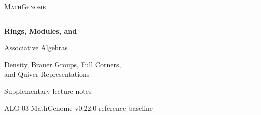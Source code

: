 \documentclass[11pt,oneside,openany]{book}
\theoremstyle{definition}
\theoremstyle{remark}
\begin{document}
\frontmatter
\hypersetup{pageanchor=false}
\begin{titlepage}
  \thispagestyle{empty}
  \begin{flushleft}
    \vspace*{0.65in}
    {\large\scshape\color{deepgreen}MathGenome\par}
    \vspace{0.32in}
    {\color{rulegreen}\rule{0.94\textwidth}{0.65pt}\par}
    \vspace{0.45in}
    {\color{ink}\fontsize{34}{39}\selectfont\bfseries
       Rings, Modules, and\par Associative Algebras\par}
    \vspace{0.30in}
    {\color{deepgreen}\Large
       Density, Brauer Groups, Full Corners,\\[3pt]
       and Quiver Representations\par}
    \vfill
    {\large Supplementary lecture notes\par}
    \vspace{0.12in}
    {\normalsize ALG-03 \enspace\textperiodcentered\enspace MathGenome v0.22.0 reference baseline\par}
    \vspace*{0.48in}
  \end{flushleft}
\end{titlepage}
\hypersetup{pageanchor=true}
{\small\tableofcontents}


\mainmatter




\end{document}

